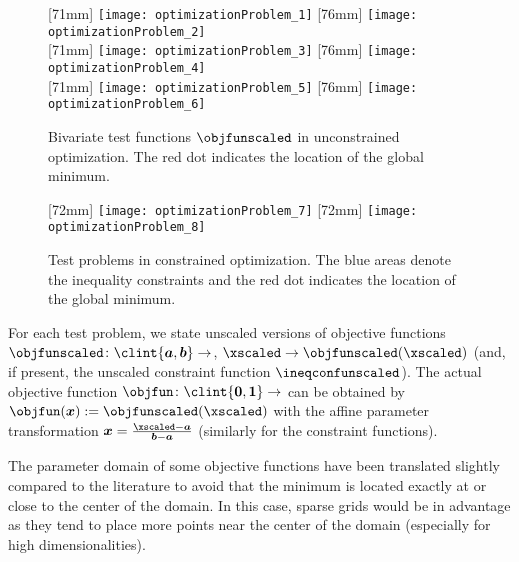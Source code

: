 \begin{figure}
  [71mm]{%
    \texttt{[image: optimizationProblem\_1]}%
  }%
  \hfill%
  [76mm]{%
    \texttt{[image: optimizationProblem\_2]}%
  }\\[2.5mm]%
  [71mm]{%
    \texttt{[image: optimizationProblem\_3]}%
  }%
  \hfill%
  [76mm]{%
    \texttt{[image: optimizationProblem\_4]}%
  }\\[2.5mm]%
  [71mm]{%
    \texttt{[image: optimizationProblem\_5]}%
  }%
  \hfill%
  [76mm]{%
    \texttt{[image: optimizationProblem\_6]}%
  }%
  \caption[%
    Unconstrained test problems%
  ]{%
    Bivariate test functions $\objfunscaled$ in unconstrained optimization.
    The \textcolor{C1}{red dot} indicates the location of the
    global minimum.%
  }%
  \label{fig:unconstrainedOptimizationProblem}%
\end{figure}

\begin{figure}
  [72mm]{%
    \texttt{[image: optimizationProblem\_7]}%
  }%
  \hfill%
  [72mm]{%
    \texttt{[image: optimizationProblem\_8]}%
  }%
  \caption[%
    Constrained test problems%
  ]{%
    Test problems in constrained optimization.
    The \textcolor{C0}{blue areas} denote the inequality constraints and
    the \textcolor{C1}{red dot} indicates the location of the
    global minimum.%
  }%
  \label{fig:constrainedOptimizationProblem}%
\end{figure}

For each test problem, we state unscaled versions of objective functions
$\objfunscaled\colon \clint{\*a, \*b} \to \real$,
$\xscaled \to \objfunscaled(\xscaled)$
(and, if present, the unscaled constraint function $\ineqconfunscaled$).
The actual objective function $\objfun\colon \clint{\*0, \*1} \to \real$
can be obtained by $\objfun(\*x) := \objfunscaled(\xscaled)$
with the affine parameter transformation
$\*x = \tfrac{\xscaled - \*a}{\*b - \*a}$
(similarly for the constraint functions).

The parameter domain of some objective functions have been translated slightly
compared to the literature
to avoid that the minimum is located exactly at or close to
the center of the domain.
In this case, sparse grids would be in advantage as
they tend to place more points near the center of the domain
(especially for high dimensionalities).
